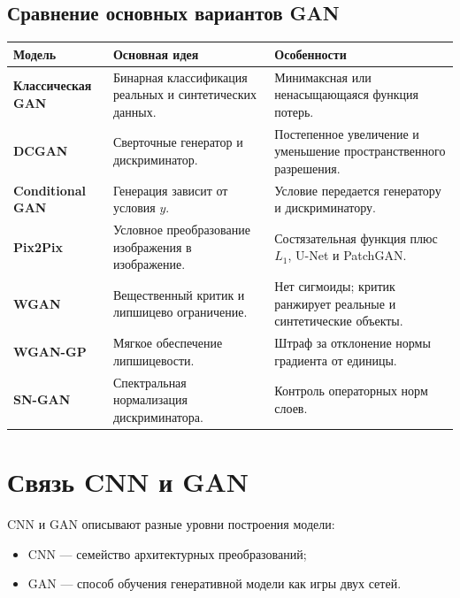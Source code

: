 \documentclass[12pt,a4paper]{article}
\numberwithin{equation}{section}
\theoremstyle{definition}
\theoremstyle{remark}
\begin{document}
\subsection{Сравнение основных вариантов GAN}

\begin{center}
\begin{tabularx}{\textwidth}{
    >{\bfseries}p{2.7cm}
    X
    X
}
\toprule
Модель & Основная идея & Особенности\\
\midrule

Классическая GAN
&
Бинарная классификация реальных и синтетических данных.
&
Минимаксная или ненасыщающаяся функция потерь.\\

DCGAN
&
Сверточные генератор и дискриминатор.
&
Постепенное увеличение и уменьшение пространственного разрешения.\\

Conditional GAN
&
Генерация зависит от условия \(y\).
&
Условие передается генератору и дискриминатору.\\

Pix2Pix
&
Условное преобразование изображения в изображение.
&
Состязательная функция плюс \(L_1\), U-Net и PatchGAN.\\

WGAN
&
Вещественный критик и липшицево ограничение.
&
Нет сигмоиды; критик ранжирует реальные и синтетические объекты.\\

WGAN-GP
&
Мягкое обеспечение липшицевости.
&
Штраф за отклонение нормы градиента от единицы.\\

SN-GAN
&
Спектральная нормализация дискриминатора.
&
Контроль операторных норм слоев.\\
\bottomrule
\end{tabularx}
\end{center}

\section{Связь CNN и GAN}

CNN и GAN описывают разные уровни построения модели:

\begin{itemize}
    \item CNN --- семейство архитектурных преобразований;
    \item GAN --- способ обучения генеративной модели как игры двух
    сетей.
\end{itemize}
\end{document}
